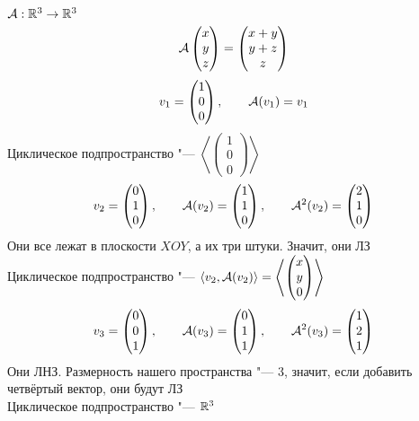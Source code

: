 \begin{eg}
	$ \mathcal{A} : \mathbb{R}^3 \to \mathbb{R}^3 $
	$$ \mathcal{A}
	\begin{pmatrix}
		x \\
		y \\
		z
	\end{pmatrix} =
	\begin{pmatrix}
		x + y \\
		y + z \\
		z
	\end{pmatrix} $$
	$$ v_1 =
	\begin{pmatrix}
		1 \\
		0 \\
		0
	\end{pmatrix}, \qquad \mathcal{A}(v_1) = v_1 $$
	Циклическое подпространство "--- $ \left\langle
	\begin{pmatrix}
		1 \\
		0 \\
		0
	\end{pmatrix} \right\rangle $
	$$ v_2 =
	\begin{pmatrix}
		0 \\
		1 \\
		0
	\end{pmatrix}, \qquad \mathcal{A}(v_2) =
	\begin{pmatrix}
		1 \\
		1 \\
		0
	\end{pmatrix}, \qquad \mathcal{A}^2(v_2) =
	\begin{pmatrix}
		2 \\
		1 \\
		0
	\end{pmatrix} $$
	Они все лежат в плоскости $ XOY $, а их три штуки. Значит, они ЛЗ \\
	Циклическое подпространство "--- $ \Braket{v_2, \mathcal{A}(v_2)} = \left\langle
	\begin{pmatrix}
		x \\
		y \\
		0
	\end{pmatrix} \right\rangle $
	$$ v_3 =
	\begin{pmatrix}
		0 \\
		0 \\
		1
	\end{pmatrix}, \qquad \mathcal{A}(v_3) =
	\begin{pmatrix}
		0 \\
		1 \\
		1
	\end{pmatrix}, \qquad \mathcal{A}^2(v_3) =
	\begin{pmatrix}
		1 \\
		2 \\
		1
	\end{pmatrix} $$
	Они ЛНЗ. Размерность нашего пространства "--- 3, значит, если добавить четвёртый вектор, они будут ЛЗ \\
	Циклическое подпространство "--- $ \mathbb{R}^3 $
\end{eg}

